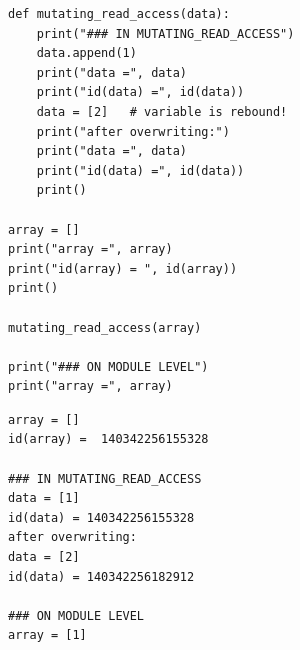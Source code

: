
\begin{frame}[fragile]
%
\begin{tcbraster}[raster columns=2,
                  raster equal height,
                  nobeforeafter,
                  raster column skip=0.2cm]
\begin{codebox}
\begin{verbatim}
def mutating_read_access(data):
    print("### IN MUTATING_READ_ACCESS")
    data.append(1)
    print("data =", data)
    print("id(data) =", id(data))
    data = [2]   # variable is rebound!
    print("after overwriting:")
    print("data =", data)
    print("id(data) =", id(data))
    print()

array = []
print("array =", array)
print("id(array) = ", id(array))
print()

mutating_read_access(array)

print("### ON MODULE LEVEL")
print("array =", array)
\end{verbatim}
\end{codebox}
%
\begin{cmdbox}
\begin{verbatim}
array = []
id(array) =  140342256155328

### IN MUTATING_READ_ACCESS
data = [1]
id(data) = 140342256155328
after overwriting:
data = [2]
id(data) = 140342256182912

### ON MODULE LEVEL
array = [1]
\end{verbatim}
\end{cmdbox}
\end{tcbraster}
%
\end{frame}


